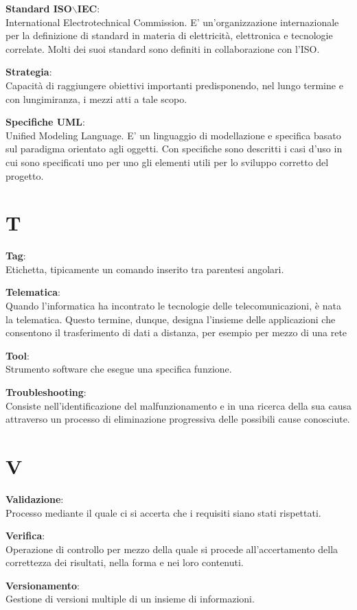 \documentclass[a4paper, oneside, openany, dvipsnames, table]{article}
\begin{document}
\textbf{Standard ISO$\backslash$IEC}:\\	International Electrotechnical Commission. E' un'organizzazione internazionale per la definizione di standard in materia di elettricità, elettronica e tecnologie correlate. Molti dei suoi standard sono definiti in collaborazione con l'ISO.

\textbf{Strategia}:\\	Capacità di raggiungere obiettivi importanti predisponendo, nel lungo termine e con lungimiranza, i mezzi atti a tale scopo.

\textbf{Specifiche UML}:\\	Unified Modeling Language. E' un linguaggio di modellazione e specifica basato sul paradigma orientato agli oggetti. Con specifiche  sono descritti i casi d'uso in cui sono specificati uno per uno gli elementi utili per lo sviluppo corretto del progetto.


\newpage
\section{T}
\textbf{Tag}:\\	Etichetta, tipicamente un comando inserito tra parentesi angolari.

\textbf{Telematica}:\\	 Quando l'informatica ha incontrato le tecnologie delle telecomunicazioni, è nata la telematica. Questo termine, dunque, designa l'insieme delle applicazioni che consentono il trasferimento di dati a distanza, per esempio per mezzo di una rete 

\textbf{Tool}:\\	Strumento software che esegue una specifica funzione.

\textbf{Troubleshooting}:\\	Consiste nell'identificazione del malfunzionamento e in una ricerca della sua causa attraverso un processo di eliminazione progressiva delle possibili cause conosciute.


\newpage
\section{V}
\textbf{Validazione}:\\	Processo mediante il quale ci si accerta che i requisiti siano stati rispettati.

\textbf{Verifica}:\\	Operazione di controllo per mezzo della quale si procede all'accertamento della correttezza dei risultati, nella forma e nei loro contenuti.

\textbf{Versionamento}:\\	Gestione di versioni multiple di un insieme di informazioni.
\end{document}
